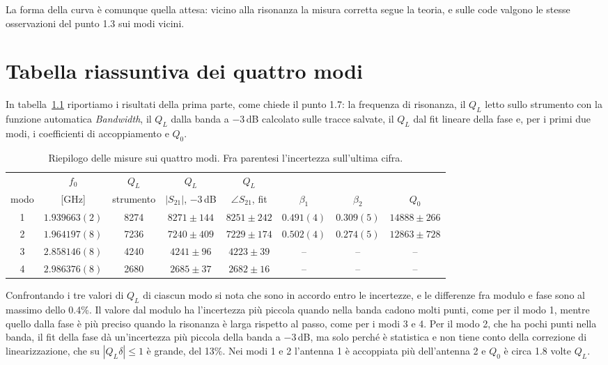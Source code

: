 \documentclass[11pt,a4paper,oneside]{book}
\begin{document}
La forma della curva è comunque quella attesa: vicino alla risonanza la misura corretta segue la teoria, e sulle code valgono le stesse osservazioni del punto 1.3 sui modi vicini.

\chapter{Tabella riassuntiva dei quattro modi}
\label{cap:riepilogo}

In tabella~\ref{tab:riepilogo} riportiamo i risultati della prima parte, come chiede il punto 1.7: la frequenza di risonanza, il $Q_L$ letto sullo strumento con la funzione automatica \emph{Bandwidth}, il $Q_L$ dalla banda a $-3$\,dB calcolato sulle tracce salvate, il $Q_L$ dal fit lineare della fase e, per i primi due modi, i coefficienti di accoppiamento e $Q_0$.

\begin{table}[H]
\centering
\renewcommand{\arraystretch}{1.3}
\setlength{\tabcolsep}{4pt}
\small
\begin{tabular}{c c c c c c c c}
\hline
 & $f_0$ & $Q_L$ & $Q_L$ & $Q_L$ & & & \\
modo & [GHz] & strumento & $|S_{21}|$, $-3$\,dB & $\angle S_{21}$, fit & $\beta_1$ & $\beta_2$ & $Q_0$ \\ \hline
1 & $1.939663(2)$ & 8274 & $8271 \pm 144$ & $8251 \pm 242$ & $0.491(4)$ & $0.309(5)$ & $14888 \pm 266$ \\
2 & $1.964197(8)$ & 7236 & $7240 \pm 409$ & $7229 \pm 174$ & $0.502(4)$ & $0.274(5)$ & $12863 \pm 728$ \\
3 & $2.858146(8)$ & 4240 & $4241 \pm 96$  & $4223 \pm 39$  & -- & -- & -- \\
4 & $2.986376(8)$ & 2680 & $2685 \pm 37$  & $2682 \pm 16$  & -- & -- & -- \\ \hline
\end{tabular}
\caption{Riepilogo delle misure sui quattro modi. Fra parentesi l'incertezza sull'ultima cifra.}
\label{tab:riepilogo}
\end{table}

Confrontando i tre valori di $Q_L$ di ciascun modo si nota che sono in accordo entro le incertezze, e le differenze fra modulo e fase sono al massimo dello 0.4\%. Il valore dal modulo ha l'incertezza più piccola quando nella banda cadono molti punti, come per il modo 1, mentre quello dalla fase è più preciso quando la risonanza è larga rispetto al passo, come per i modi 3 e 4. Per il modo 2, che ha pochi punti nella banda, il fit della fase dà un'incertezza più piccola della banda a $-3$\,dB, ma solo perché è statistica e non tiene conto della correzione di linearizzazione, che su $|Q_L\delta|\le1$ è grande, del 13\%. Nei modi 1 e 2 l'antenna 1 è accoppiata più dell'antenna 2 e $Q_0$ è circa 1.8 volte $Q_L$.
\end{document}
